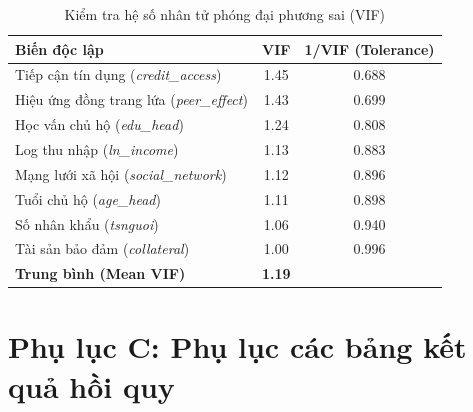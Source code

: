 \documentclass[12pt,a4paper]{report}
\begin{document}
\begin{table}[htbp]
	\centering
	\caption{Kiểm tra hệ số nhân tử phóng đại phương sai (VIF)}
	\label{tab:app_vif}
	\renewcommand{\arraystretch}{1.2}
	\begin{tabular}{l c c}
		\toprule
		\textbf{Biến độc lập} & \textbf{VIF} & \textbf{1/VIF (Tolerance)} \\
		\midrule
		Tiếp cận tín dụng (\textit{credit\_access}) & 1.45 & 0.688 \\
		Hiệu ứng đồng trang lứa (\textit{peer\_effect}) & 1.43 & 0.699 \\
		Học vấn chủ hộ (\textit{edu\_head}) & 1.24 & 0.808 \\
		Log thu nhập (\textit{ln\_income}) & 1.13 & 0.883 \\
		Mạng lưới xã hội (\textit{social\_network}) & 1.12 & 0.896 \\
		Tuổi chủ hộ (\textit{age\_head}) & 1.11 & 0.898 \\
		Số nhân khẩu (\textit{tsnguoi}) & 1.06 & 0.940 \\
		Tài sản bảo đảm (\textit{collateral}) & 1.00 & 0.996 \\
		\midrule
		\textbf{Trung bình (Mean VIF)} & \textbf{1.19} & \\
		\bottomrule
	\end{tabular}
\end{table}


\newpage	
\section*{Phụ lục C: Phụ lục các bảng kết quả hồi quy}
\end{document}
